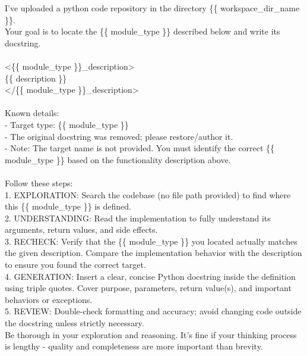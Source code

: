 \vspace{0.4cm}
\begin{tcolorbox}[colback=gray!5!white,colframe=gray!75!black,title=Function Localization Prompt,fontupper={\scriptsize\ttfamily\rightskip=0pt plus 1fil},breakable,break at=-36pt]

I've uploaded a python code repository in the directory \{\{ workspace\_dir\_name \}\}.\\
Your goal is to locate the \{\{ module\_type \}\} described below and write its docstring.\\
\\
<\{\{ module\_type \}\}\_description>\\
\{\{ description \}\}\\
</\{\{ module\_type \}\}\_description>\\
\\
Known details:\\
- Target type: \{\{ module\_type \}\}\\
- The original docstring was removed; please restore/author it.\\
- Note: The target name is not provided. You must identify the correct \{\{ module\_type \}\} based on the functionality description above.\\
\\
Follow these steps:\\
1. EXPLORATION: Search the codebase (no file path provided) to find where this \{\{ module\_type \}\} is defined.\\
2. UNDERSTANDING: Read the implementation to fully understand its arguments, return values, and side effects.\\
3. RECHECK: Verify that the \{\{ module\_type \}\} you located actually matches the given description. Compare the implementation behavior with the description to ensure you found the correct target.\\
4. GENERATION: Insert a clear, concise Python docstring inside the definition using triple quotes. Cover purpose, parameters, return value(s), and important behaviors or exceptions.\\
5. REVIEW: Double-check formatting and accuracy; avoid changing code outside the docstring unless strictly necessary.\\
Be thorough in your exploration and reasoning. It's fine if your thinking process is lengthy - quality and completeness are more important than brevity.
\end{tcolorbox}
\label{catradar:fig:prompt-funcloc}


